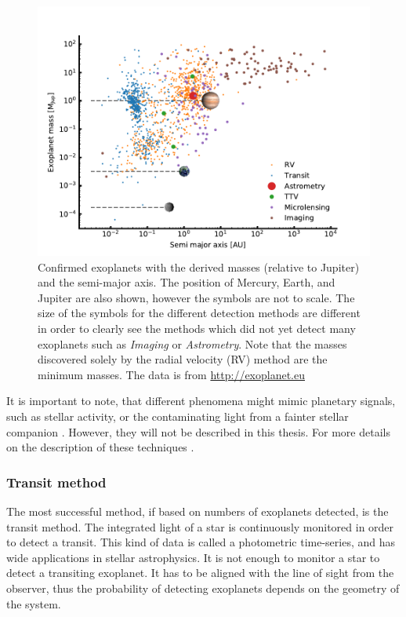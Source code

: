 \begin{figure}[htpb!]
    \centering
    \includegraphics[width=1.0\linewidth]{figures/exoplanetDetectionType.pdf}
    \caption{Confirmed exoplanets with the derived masses (relative to Jupiter) and the semi-major
             axis. The position of Mercury, Earth, and Jupiter are also shown, however the symbols
             are not to scale. The size of the symbols for the different detection methods are
             different in order to clearly see the methods which did not yet detect many exoplanets
             such as \emph{Imaging} or \emph{Astrometry}. Note that the masses discovered solely by
             the radial velocity (RV) method are the minimum masses. The data is from
             \url{http://exoplanet.eu}}
    \label{fig:detectionTypes}
\end{figure}

It is important to note, that different phenomena might mimic planetary signals, such as stellar
activity, or the contaminating light from a fainter stellar companion \citep[see
e.g.][]{Queloz2001,Oshagh2013,Oshagh2014}. However, they will not be described in this thesis. For
more details on the description of these techniques \citet[see e.g][]{Seager2010}.


\subsubsection{Transit method}
\label{sec:transitMethod}

The most successful method, if based on numbers of exoplanets detected, is the transit method. The
integrated light of a star is continuously monitored in order to detect a transit. This kind of data
is called a photometric time-series, and has wide applications in stellar astrophysics. It is not
enough to monitor a star to detect a transiting exoplanet. It has to be aligned with the line of
sight from the observer, thus the probability of detecting exoplanets depends on the geometry of the
system.

